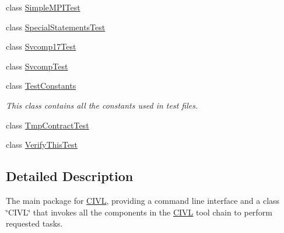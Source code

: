 \begin{DoxyCompactItemize}
\item 
class \hyperlink{classedu_1_1udel_1_1cis_1_1vsl_1_1civl_1_1SimpleMPITest}{Simple\+M\+P\+I\+Test}
\item 
class \hyperlink{classedu_1_1udel_1_1cis_1_1vsl_1_1civl_1_1SpecialStatementsTest}{Special\+Statements\+Test}
\item 
class \hyperlink{classedu_1_1udel_1_1cis_1_1vsl_1_1civl_1_1Svcomp17Test}{Svcomp17\+Test}
\item 
class \hyperlink{classedu_1_1udel_1_1cis_1_1vsl_1_1civl_1_1SvcompTest}{Svcomp\+Test}
\item 
class \hyperlink{classedu_1_1udel_1_1cis_1_1vsl_1_1civl_1_1TestConstants}{Test\+Constants}
\begin{DoxyCompactList}\small\item\em This class contains all the constants used in test files. \end{DoxyCompactList}\item 
class \hyperlink{classedu_1_1udel_1_1cis_1_1vsl_1_1civl_1_1TmpContractTest}{Tmp\+Contract\+Test}
\item 
class \hyperlink{classedu_1_1udel_1_1cis_1_1vsl_1_1civl_1_1VerifyThisTest}{Verify\+This\+Test}
\end{DoxyCompactItemize}


\subsection{Detailed Description}
The main package for \hyperlink{classedu_1_1udel_1_1cis_1_1vsl_1_1civl_1_1CIVL}{C\+I\+V\+L}, providing a command line interface and a class \char`\"{}\+C\+I\+V\+L\char`\"{} that invokes all the components in the \hyperlink{classedu_1_1udel_1_1cis_1_1vsl_1_1civl_1_1CIVL}{C\+I\+V\+L} tool chain to perform requested tasks. 